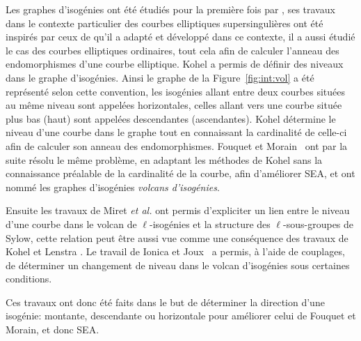 \documentclass[10pt,a4paper]{book}
\theoremstyle{plain}
\theoremstyle{definition}
\theoremstyle{definition}
\theoremstyle{definition}
\theoremstyle{definition}
\theoremstyle{definition}
\theoremstyle{remark}
\theoremstyle{remark}
\theoremstyle{definition}
\begin{document}
Les graphes d'isogénies ont été étudiés pour la première fois par 
\cite{Kohel96}, ses travaux dans le contexte particulier des courbes elliptiques
supersingulières ont été inspirés par ceux de \cite{Mestre86,Pizer90,Pizer95} 
qu'il a adapté et développé dans ce contexte, il a aussi étudié le cas des 
courbes elliptiques ordinaires, tout cela afin de calculer l'anneau des 
endomorphismes d'une courbe 
elliptique. Kohel a permis de définir des niveaux dans le graphe 
d'isogénies. Ainsi le graphe de la Figure~\ref{fig:int:vol} a été représenté
selon cette convention, les isogénies allant entre deux courbes situées au même
niveau sont appelées horizontales, celles allant vers une courbe située plus 
bas (haut) sont appelées descendantes (ascendantes). %
Kohel détermine le niveau d'une courbe dans le graphe tout en 
connaissant la cardinalité de celle-ci afin de calculer son anneau des 
endomorphismes. Fouquet et Morain~\cite{FouquetMorain02} ont par la suite résolu le même 
problème, en adaptant les méthodes de Kohel sans la connaissance préalable de 
la cardinalité de la courbe, afin d'améliorer SEA, et ont nommé les graphes 
d'isogénies \emph{volcans d'isogénies}. 

Ensuite les travaux de Miret \textit{et al.} 
\cite{MiretMRV05}  \cite{MiretMSTV06} 
\cite{MiretMSTV08} ont permis d'expliciter un lien entre le niveau d'une courbe
dans le volcan de $\ell$-isogénies et la structure des $\ell$-sous-groupes de 
Sylow, cette relation peut être aussi vue comme une conséquence des travaux de 
Kohel \cite{Kohel96} et Lenstra \cite{Lenstra96}. 
Le travail de Ionica et Joux~\cite{Ionica-Joux10} a permis, à l'aide de 
couplages, de déterminer un changement de niveau dans le volcan d'isogénies 
sous certaines conditions.


Ces travaux ont donc été faits dans le but de 
déterminer la direction d'une isogénie: montante, descendante ou horizontale pour 
améliorer celui de Fouquet et Morain, et donc SEA.
\end{document}
